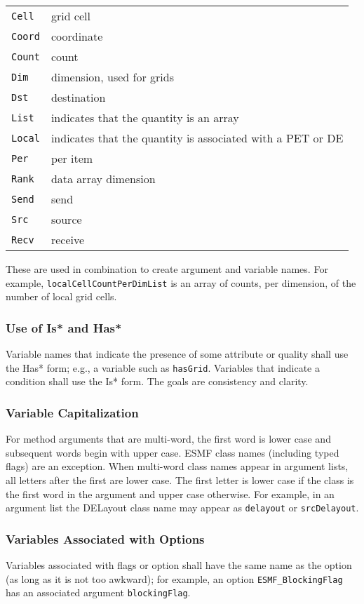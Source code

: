 \begin{tabular}{ll}
{\tt Cell} & grid cell \\
{\tt Coord} & coordinate \\
{\tt Count} & count \\
{\tt Dim} & dimension, used for grids \\
{\tt Dst} & destination \\
{\tt List} & indicates that the quantity is an array \\
{\tt Local} & indicates that the quantity is associated with a PET or DE \\
{\tt Per} & per item \\
{\tt Rank} & data array dimension \\
{\tt Send} & send \\
{\tt Src} & source \\
{\tt Recv} & receive \\
\end{tabular}


These are used in combination to create argument and variable names.  
For example, {\tt localCellCountPerDimList} is an array of counts, per 
dimension, of the number of local grid cells.

\subsubsection{Use of Is* and Has*} Variable names that indicate the 
presence of some attribute or quality shall use the Has* form; e.g., a 
variable such as {\tt hasGrid}.  Variables that indicate a condition shall 
use the Is* form.  The goals are consistency and clarity.

\subsubsection{Variable Capitalization} 
For method arguments that are multi-word, the first word is lower
case and subsequent words begin with upper case.  ESMF class 
names (including typed flags) are an exception.  When multi-word 
class names appear in argument lists, all letters after the first 
are lower case.  The first letter is lower case if the class is the
first word in the argument and upper case otherwise.  For 
example, in an argument list the DELayout class name may appear 
as {\tt delayout} or {\tt srcDelayout}.

\subsubsection{Variables Associated with Options}
Variables associated with flags or option shall have the same name as
the option (as long as it is not too awkward); for example, an option 
{\tt ESMF\_BlockingFlag} has an associated argument {\tt blockingFlag}.


